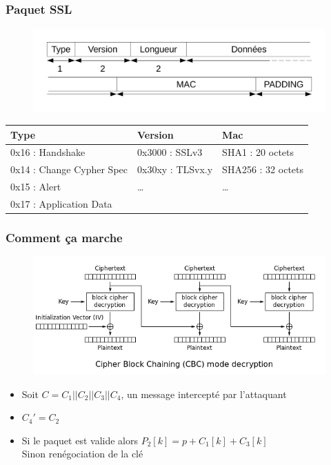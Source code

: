 \begin{frame}
  \frametitle{Paquet SSL}
  \begin{figure}[h]
    \centering
    \includegraphics[scale=0.5]{schemaSSL2}
  \end{figure}
  \begin{tabular}{|l|l|l|}
    \hline
  Type  & Version & Mac \\
    \hline
   0x16 : Handshake  &  0x3000 : SSLv3 &  SHA1 : 20 octets\\
   0x14 : Change Cypher Spec &  0x30xy : TLSvx.y & SHA256 : 32 octets\\
   0x15 : Alert & \dots & \dots\\
   0x17 : Application Data  & &\\
    \hline
  \end{tabular}

\end{frame}

\begin{frame}
  \frametitle{Comment ça marche}
  \begin{figure}[h]
    \centering
  \includegraphics[scale=0.3]{CBC_Decrypt}
  \end{figure}
    \begin{itemize}
  \item  Soit $C = C_1 || C_2 || C_3 || C_4$, un message intercepté par l'attaquant
    \pause
  \item $C_4'=C_2$
    \pause
  \item Si le paquet est valide alors $P_2[k] = p + C_1[k] + C_3[k]$ \\
    Sinon renégociation de la clé
  \end{itemize}
\end{frame}

